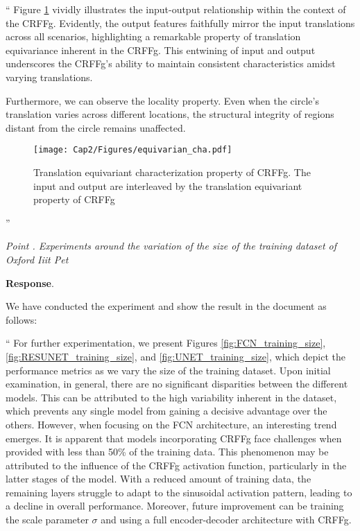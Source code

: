 \documentclass[review,12pt]{report}
\newenvironment{reviewer}{\setcounter{pointcounter}{1}}{}
\newcommand{\point}[1]{\medskip \noindent
 \textsl{{\fontseries{b}\selectfont Point \thepointcounter}.
 \stepcounter{pointcounter} #1}}
\newcommand{\reply}{\medskip \noindent \textbf{Response}.\ }
\begin{document}
\begin{reviewer}
{`` Figure \ref{fig:CRFFg_equivariant} vividly illustrates the input-output relationship within the context of the CRFFg. Evidently, the output features faithfully mirror the input translations across all scenarios, highlighting a remarkable property of translation equivariance inherent in the CRFFg. This entwining of input and output underscores the CRFFg's ability to maintain consistent characteristics amidst varying translations.

Furthermore, we can observe the locality property.  Even when the circle's translation varies across different locations, the structural integrity of regions distant from the circle remains unaffected. 

\begin{figure}[H]
\begin{centering}
\texttt{[image: Cap2/Figures/equivarian\_cha.pdf]}
\par\end{centering}
\caption{Translation equivariant characterization property of CRFFg. The input and output are interleaved by the translation equivariant property of CRFFg}
\label{fig:CRFFg_equivariant}
\end{figure}
''

}



\point{Experiments around the variation of the size of the training dataset of Oxford Iiit Pet}

\reply{

We have conducted the experiment and show the result in the document as follows: 

`` For further experimentation, we present Figures \ref{fig:FCN_training_size}, \ref{fig:RESUNET_training_size}, and \ref{fig:UNET_training_size}, which depict the performance metrics as we vary the size of the training dataset. Upon initial examination, in general, there are no significant disparities between the different models. This can be attributed to the high variability inherent in the dataset, which prevents any single model from gaining a decisive advantage over the others. However, when focusing on the FCN architecture, an interesting trend emerges. It is apparent that models incorporating CRFFg face challenges when provided with less than 50\% of the training data. This phenomenon may be attributed to the influence of the CRFFg activation function, particularly in the latter stages of the model. With a reduced amount of training data, the remaining layers struggle to adapt to the sinusoidal activation pattern, leading to a decline in overall performance. Moreover, future improvement can be training the scale parameter $\sigma$ and using a full encoder-decoder architecture with CRFFg.


}
\end{reviewer}
\end{document}
